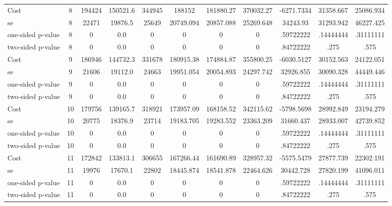 \begin{tabular}{lcccccccccc}
Cost 			  &         8 &    194424 &  150521.6 &    344945 & 188152 & 181880.27 & 370032.27 & -6271.7334 & 31358.667 & 25086.934 \\  
se 				  &         8 &     22471 &   19876.5 &     25649 & 20749.094 & 20857.088 & 25269.648 & 34243.93 & 31293.942 & 46227.425 \\  
one-sided p-value &         8 &         0 &       0.0 &         0 & 0 & 0 & 0 & .59722222 & .14444444 & .31111111 \\  
two-sided p-value &         8 &         0 &       0.0 &         0 & 0 & 0 & 0 & .84722222 & .275 & .575 \\  
Cost 			  &         9 &    186946 &  144732.3 &    331678 & 180915.38 & 174884.87 & 355800.25 & -6030.5127 & 30152.563 & 24122.051 \\  
se 				  &         9 &     21606 &   19112.0 &     24663 & 19951.054 & 20054.893 & 24297.742 & 32926.855 & 30090.328 & 44449.446 \\  
one-sided p-value &         9 &         0 &       0.0 &         0 & 0 & 0 & 0 & .59722222 & .14444444 & .31111111 \\  
two-sided p-value &         9 &         0 &       0.0 &         0 & 0 & 0 & 0 & .84722222 & .275 & .575 \\  
Cost 			  &        10 &    179756 &  139165.7 &    318921 & 173957.09 & 168158.52 & 342115.62 & -5798.5698 & 28992.849 & 23194.279 \\  
se 				 &        10 &     20775 &   18376.9 &     23714 & 19183.705 & 19283.552 & 23363.209 & 31660.437 & 28933.007 & 42739.852 \\  
one-sided p-value&        10 &         0 &       0.0 &         0 & 0 & 0 & 0 & .59722222 & .14444444 & .31111111 \\  
two-sided p-value&        10 &         0 &       0.0 &         0 & 0 & 0 & 0 & .84722222 & .275 & .575 \\  
Cost 			  &        11 &    172842 &  133813.1 &    306655 & 167266.44 & 161690.89 & 328957.32 & -5575.5479 & 27877.739 & 22302.191 \\  
se 				 &        11 &     19976 &   17670.1 &     22802 & 18445.874 & 18541.878 & 22464.626 & 30442.728 & 27820.199 & 41096.011 \\  
one-sided p-value&        11 &         0 &       0.0 &         0 & 0 & 0 & 0 & .59722222 & .14444444 & .31111111 \\  
two-sided p-value&        11 &         0 &       0.0 &         0 & 0 & 0 & 0 & .84722222 & .275 & .575 \\  

\end{tabular}
